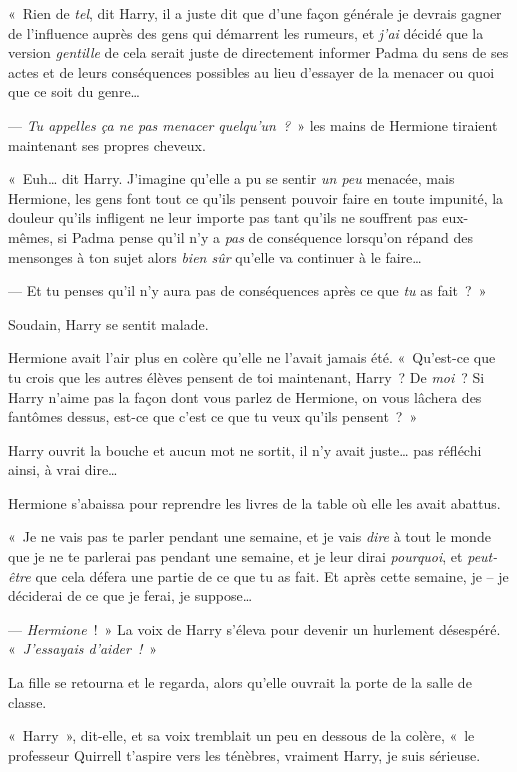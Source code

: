 «~Rien de \emph{tel}, dit Harry, il a juste dit que d'une façon générale je devrais gagner de l'influence auprès des gens qui démarrent les rumeurs, et \emph{j'ai} décidé que la version \emph{gentille} de cela serait juste de directement informer Padma du sens de ses actes et de leurs conséquences possibles au lieu d'essayer de la menacer ou quoi que ce soit du genre…

--- \emph{Tu appelles ça ne pas menacer quelqu'un~?}~» les mains de Hermione tiraient maintenant ses propres cheveux.

«~Euh… dit Harry.
J'imagine qu'elle a pu se sentir \emph{un peu} menacée, mais Hermione, les gens font tout ce qu'ils pensent pouvoir faire en toute impunité, la douleur qu'ils infligent ne leur importe pas tant qu'ils ne souffrent pas eux-mêmes, si Padma pense qu'il n'y a \emph{pas} de conséquence lorsqu'on répand des mensonges à ton sujet alors \emph{bien sûr} qu'elle va continuer à le faire…

--- Et tu penses qu'il n'y aura pas de conséquences après ce que \emph{tu} as fait~?~»

Soudain, Harry se sentit malade.

Hermione avait l'air plus en colère qu'elle ne l'avait jamais été.
«~Qu'est-ce que tu crois que les autres élèves pensent de toi maintenant, Harry~?
De \emph{moi}~?
Si Harry n'aime pas la façon dont vous parlez de Hermione, on vous lâchera des fantômes dessus, est-ce que c'est ce que tu veux qu'ils pensent~?~»

Harry ouvrit la bouche et aucun mot ne sortit, il n'y avait juste… pas réfléchi ainsi, à vrai dire…

Hermione s'abaissa pour reprendre les livres de la table où elle les avait abattus.

«~Je ne vais pas te parler pendant une semaine, et je vais \emph{dire} à tout le monde que je ne te parlerai pas pendant une semaine, et je leur dirai \emph{pourquoi}, et \emph{peut-être} que cela défera une partie de ce que tu as fait.
Et après cette semaine, je -- je déciderai de ce que je ferai, je suppose…

--- \emph{Hermione}~!~»
La voix de Harry s'éleva pour devenir un hurlement désespéré.
«~\emph{J'essayais d'aider~!}~»

La fille se retourna et le regarda, alors qu'elle ouvrait la porte de la salle de classe.

«~Harry~», dit-elle, et sa voix tremblait un peu en dessous de la colère, «~le professeur Quirrell t'aspire vers les ténèbres, vraiment Harry, je suis sérieuse.

